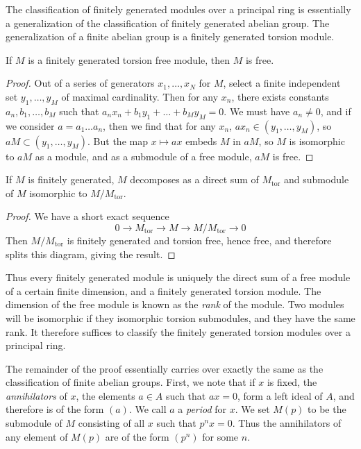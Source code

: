 The classification of finitely generated modules over a principal ring is essentially a generalization of the classification of finitely generated abelian group. The generalization of a finite abelian group is a finitely generated torsion module.

\begin{lemma}
    If $M$ is a finitely generated torsion free module, then $M$ is free.
\end{lemma}
\begin{proof}
    Out of a series of generators $x_1, \dots, x_N$ for $M$, select a finite independent set $y_1, \dots, y_M$ of maximal cardinality. Then for any $x_n$, there exists constants $a_n,b_1, \dots, b_M$ such that $a_nx_n + b_1y_1 + \dots + b_My_M = 0$. We must have $a_n \neq 0$, and if we consider $a = a_1 \dots a_n$, then we find that for any $x_n$, $ax_n \in (y_1, \dots, y_M)$, so $aM \subset (y_1, \dots, y_M)$. But the map $x \mapsto ax$ embeds $M$ in $aM$, so $M$ is isomorphic to $aM$ as a module, and as a submodule of a free module, $aM$ is free.
\end{proof}

\begin{theorem}
    If $M$ is finitely generated, $M$ decomposes as a direct sum of $M_{\text{tor}}$ and submodule of $M$ isomorphic to $M/M_{\text{tor}}$.
\end{theorem}
\begin{proof}
    We have a short exact sequence
    \[ 0 \to M_{\text{tor}} \to M \to M/M_{\text{tor}} \to 0 \]
    Then $M/M_{\text{tor}}$ is finitely generated and torsion free, hence free, and therefore splits this diagram, giving the result.
\end{proof}

Thus every finitely generated module is uniquely the direct sum of a free module of a certain finite dimension, and a finitely generated torsion module. The dimension of the free module is known as the \emph{rank} of the module. Two modules will be isomorphic if they isomorphic torsion submodules, and they have the same rank. It therefore suffices to classify the finitely generated torsion modules over a principal ring.

The remainder of the proof essentially carries over exactly the same as the classification of finite abelian groups. First, we note that if $x$ is fixed, the \emph{annihilators} of $x$, the elements $a \in A$ such that $ax = 0$, form a left ideal of $A$, and therefore is of the form $(a)$. We call $a$ a \emph{period} for $x$. We set $M(p)$ to be the submodule of $M$ consisting of all $x$ such that $p^n x = 0$. Thus the annihilators of any element of $M(p)$ are of the form $(p^n)$ for some $n$.

